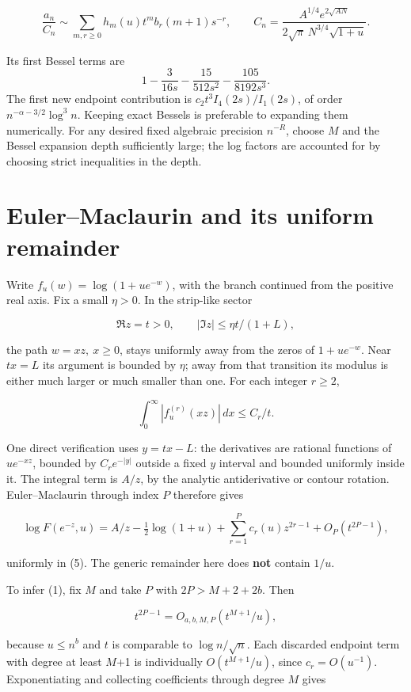 \documentclass[11pt,letterpaper]{article}
\begin{document}
\[
 \frac{a_n}{C_n}\sim\sum_{m,r\ge0}h_m(u)t^m b_r(m+1)s^{-r},\qquad
 C_n=\frac{A^{1/4}e^{2\sqrt{AN}}}{2\sqrt\pi\,N^{3/4}\sqrt{1+u}}.
\]

Its first Bessel terms are
\[1-\frac{3}{16s}-\frac{15}{512s^2}-\frac{105}{8192s^3}.\] The first new
endpoint contribution is \(c_2t^3I_4(2s)/I_1(2s)\), of order
\(n^{-\alpha-3/2}\log^3n\). Keeping exact Bessels is preferable to
expanding them numerically. For any desired fixed algebraic precision
\(n^{-R}\), choose \(M\) and the Bessel expansion depth sufficiently
large; the log factors are accounted for by choosing strict inequalities
in the depth.

\section{Euler--Maclaurin and its uniform
remainder}\label{mfp:eulermaclaurin-and-its-uniform-remainder}

Write \(f_u(w)=\log(1+ue^{-w})\), with the branch continued from the
positive real axis. Fix a small \(\eta>0\). In the strip-like sector

\[
 \Re z=t>0,\qquad |\Im z|\le\eta t/(1+L), \tag{5}
\]

the path \(w=xz,\ x\ge0\), stays uniformly away from the zeros of
\(1+ue^{-w}\). Near \(tx=L\) its argument is bounded by \(\eta\); away
from that transition its modulus is either much larger or much smaller
than one. For each integer \(r\ge2\),

\[
 \int_0^\infty |f_u^{(r)}(xz)|\,dx\le C_r/t.
\]

One direct verification uses \(y=tx-L\): the derivatives are rational
functions of \(ue^{-xz}\), bounded by \(C_re^{-|y|}\) outside a fixed
\(y\) interval and bounded uniformly inside it. The integral term is
\(A/z\), by the analytic antiderivative or contour rotation.
Euler--Maclaurin through index \(P\) therefore gives

\[
 \log F(e^{-z},u)=A/z-\tfrac12\log(1+u)
 +\sum_{r=1}^{P}c_r(u)z^{2r-1}+O_P(t^{2P-1}), \tag{6}
\]

uniformly in (5). The generic remainder here does \textbf{not} contain
\(1/u\).

To infer (1), fix \(M\) and take \(P\) with \(2P>M+2+2b\). Then

\[
 t^{2P-1}=O_{a,b,M,P}(t^{M+1}/u),
\]

because \(u\le n^b\) and \(t\) is comparable to \(\log n/\sqrt n\). Each
discarded endpoint term with degree at least \(M\)+1 is individually
\(O(t^{M+1}/u)\), since \(c_r=O(u^{-1})\). Exponentiating and collecting
coefficients through degree \(M\) gives
\end{document}
